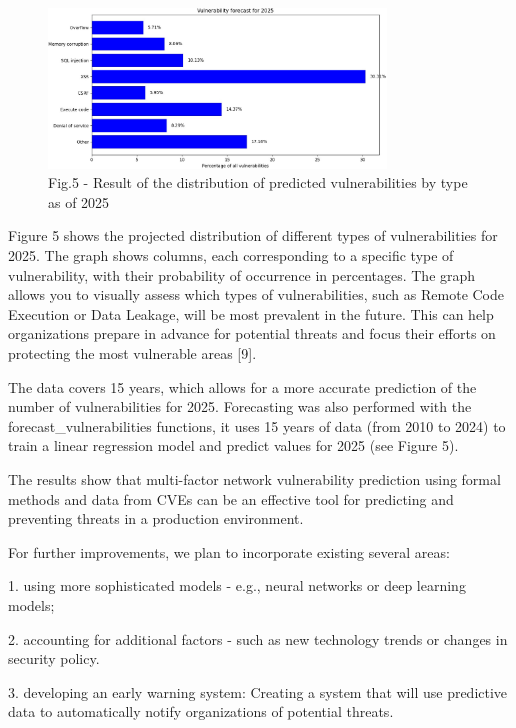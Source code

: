 \begin{figure}[H]
	\centering
	\includegraphics[width=0.8\textwidth]{media/ict2/image167}
	\caption*{Fig.5 - Result of the distribution of predicted vulnerabilities by type as of 2025}
\end{figure}

\begin{multicols}{2}
Figure 5 shows the projected distribution of different types of
vulnerabilities for 2025. The graph shows columns, each corresponding to
a specific type of vulnerability, with their probability of occurrence
in percentages. The graph allows you to visually assess which types of
vulnerabilities, such as Remote Code Execution or Data Leakage, will be
most prevalent in the future. This can help organizations prepare in
advance for potential threats and focus their efforts on protecting the
most vulnerable areas {[}9{]}.

The data covers 15 years, which allows for a more accurate prediction of
the number of vulnerabilities for 2025. Forecasting was also performed
with the forecast\_vulnerabilities functions, it uses 15 years of data
(from 2010 to 2024) to train a linear regression model and predict
values for 2025 (see Figure 5).

The results show that multi-factor network vulnerability prediction
using formal methods and data from CVEs can be an effective tool for
predicting and preventing threats in a production environment.

For further improvements, we plan to incorporate existing several areas:

1. using more sophisticated models - e.g., neural networks or deep
learning models;

2. accounting for additional factors - such as new technology trends or
changes in security policy.

3. developing an early warning system: Creating a system that will use
predictive data to automatically notify organizations of potential
threats.


\end{multicols}
